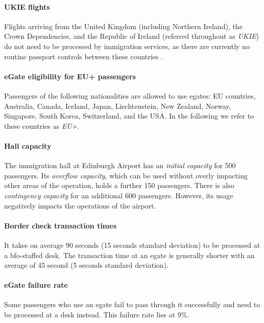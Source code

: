 \documentclass[10pt]{article}
\begin{document}
\paragraph{UKIE flights} Flights arriving from the United Kingdom (including Northern Ireland), the Crown Dependencies, and the Republic of Ireland (referred throughout as \textit{UKIE}) do not need to be processed by immigration services, as there are currently no routine passport controls between these countries \cite{common_travel_area}.

\paragraph{eGate eligibility for EU+ passengers}
Passengers of the following nationalities are allowed to use \glspl{egate}: EU countries, Australia, Canada, Iceland, Japan, Liechtenstein, New Zealand, Norway, Singapore, South Korea, Switzerland, and the USA. In the following we refer to these countries as \textit{EU+}. 

\paragraph{Hall capacity}
The immigration hall at Edinburgh Airport has an \textit{initial capacity} for 500 passengers. Its \textit{overflow capacity}, which can be used without overly impacting other areas of the operation, holds a further 150 passengers. There is also \textit{contingency capacity} for an additional 600 passengers. However, its usage negatively impacts the operations of the airport.

\paragraph{Border check transaction times} It takes on average 90 seconds (15 seconds standard deviation) to be processed at a \gls{bfo}-staffed desk. The transaction time at an \gls{egate} is generally shorter with an average of 45 second (5 seconds standard deviation). 

\paragraph{eGate failure rate}
Some passengers who use an \gls{egate} fail to pass through it successfully and need to be processed at a desk instead. This failure rate lies at 9\%.
\end{document}
